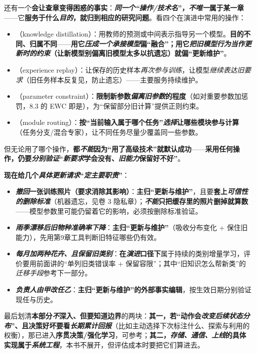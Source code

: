 还有一个\textbf{会让查章变得困惑的事实}：\textbf{\emph{同一个“操作/技术名}”，\emph{不唯一}属于某一章}——它\textbf{服务于什么\emph{目的}，就归到相应的研究问题}。看四个在演进中常用的操作：
\begin{itemize}\item {}（knowledge distillation）：用教师的预测或中间表示指导另一个模型。\textbf{目的不同、归属不同}——\textbf{用它\emph{压成一个承接模型}偏“融合”；用它\emph{把旧模型行为当作\emph{更新时的约束}}（让新模型别偏离旧模型太多以抗遗忘）就偏“更新维护”}。\item {}（experience replay）：让保存的历史样本\emph{再次参与训练}，让模型\emph{继续表达旧要求}（旧任务样本反复见，防止遗忘）——主要服务持续维护。\item {}（parameter constraint）：\textbf{限制新参数\emph{偏离旧参数}的程度}（如对重要参数加惩罚，8.3 的 EWC 即是），为“保留部分旧计算”提供正则约束。\item {}（module routing）：\textbf{按“当前输入属于哪个任务”\emph{选择}让哪些模块参与计算}（任务分支/混合专家），让不同任务尽量少覆盖同一些参数。\end{itemize}
但无论用了哪个操作，\textbf{都\emph{不能}因为“用了高级技术”就默认成功}——\textbf{采用任何操作，仍要\emph{分别验证}“\emph{新要求}学会没有、\emph{旧能力}保留好不好”}。

\textbf{现在给几个\emph{具体更新请求}“\emph{定主要职责}”}：
\begin{itemize}\item \textbf{\emph{撤回}一张训练照片（要求消除其影响）}：\textbf{主归“更新与维护”}，且要\textbf{套上\emph{可信性的删除标准}}（机器遗忘，见卷 3 隐私章）；\textbf{\emph{不能}只把缓存里的照片删掉就算数}——模型参数里可能仍留着它的影响，必须按删除标准验证。\item \textbf{\emph{雨季漂移后旧物种准确率下降}}：\textbf{主归“更新与维护”}（吸收分布变化 + 保住旧能力），先用第9章工具判断旧特征哪些仍有效。\item \textbf{\emph{每月加两种花卉、且保留旧类别}}：\textbf{在\emph{演进}口径下}属于持续的类别增量学习，评价要用前面讲的“单列旧类错误率 + 保留容限”；其中“旧知识怎么帮新类”的\emph{迁移手段}参考下一部分。\item \textbf{\emph{负责人由甲改任乙}}：\textbf{主归“更新与维护”的外部事实编辑}，按生效日期分别验证现任与历史。\end{itemize}
最后划清\textbf{本部分\emph{不}深入、但要知道边界}的两块：\textbf{其一，若“动作会\emph{改变后续状态分布}”、且决策好坏要看\emph{长期累计回报}}（比如主动选择下次标注什么、探索与利用的权衡），那已进入\textbf{序贯决策/强化学习}，可参考；\textbf{其二，\emph{存储、通信、上线}的具体实现属于\emph{系统工程}}，本书不展开，但评估成本时要把它们算进去。

